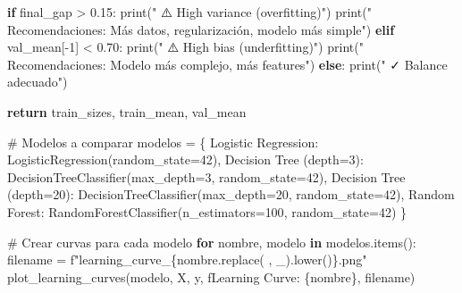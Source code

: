 \documentclass[
  doc,
  floatsintext,
  longtable,
  a4paper,
  nolmodern,
  notxfonts,
  notimes,
  12pt,
  colorlinks=true,linkcolor=blue,citecolor=blue,urlcolor=blue]{apa7}
\newenvironment{Shaded}{\begin{snugshade}}{\end{snugshade}}
\newcommand{\BuiltInTok}[1]{\textcolor[rgb]{0.00,0.23,0.31}{#1}}
\newcommand{\CommentTok}[1]{\textcolor[rgb]{0.37,0.37,0.37}{#1}}
\newcommand{\ControlFlowTok}[1]{\textcolor[rgb]{0.00,0.23,0.31}{\textbf{#1}}}
\newcommand{\DecValTok}[1]{\textcolor[rgb]{0.68,0.00,0.00}{#1}}
\newcommand{\FloatTok}[1]{\textcolor[rgb]{0.68,0.00,0.00}{#1}}
\newcommand{\KeywordTok}[1]{\textcolor[rgb]{0.00,0.23,0.31}{\textbf{#1}}}
\newcommand{\NormalTok}[1]{\textcolor[rgb]{0.00,0.23,0.31}{#1}}
\newcommand{\OperatorTok}[1]{\textcolor[rgb]{0.37,0.37,0.37}{#1}}
\newcommand{\SpecialCharTok}[1]{\textcolor[rgb]{0.37,0.37,0.37}{#1}}
\newcommand{\SpecialStringTok}[1]{\textcolor[rgb]{0.13,0.47,0.30}{#1}}
\newcommand{\StringTok}[1]{\textcolor[rgb]{0.13,0.47,0.30}{#1}}
\begin{document}
\begin{Shaded}
\begin{Highlighting}[]
    \ControlFlowTok{if}\NormalTok{ final\_gap }\OperatorTok{\textgreater{}} \FloatTok{0.15}\NormalTok{:}
        \BuiltInTok{print}\NormalTok{(}\StringTok{"  ⚠️  High variance (overfitting)"}\NormalTok{)}
        \BuiltInTok{print}\NormalTok{(}\StringTok{"  Recomendaciones: Más datos, regularización, modelo más simple"}\NormalTok{)}
    \ControlFlowTok{elif}\NormalTok{ val\_mean[}\OperatorTok{{-}}\DecValTok{1}\NormalTok{] }\OperatorTok{\textless{}} \FloatTok{0.70}\NormalTok{:}
        \BuiltInTok{print}\NormalTok{(}\StringTok{"  ⚠️  High bias (underfitting)"}\NormalTok{)}
        \BuiltInTok{print}\NormalTok{(}\StringTok{"  Recomendaciones: Modelo más complejo, más features"}\NormalTok{)}
    \ControlFlowTok{else}\NormalTok{:}
        \BuiltInTok{print}\NormalTok{(}\StringTok{"  ✓ Balance adecuado"}\NormalTok{)}
    
    \ControlFlowTok{return}\NormalTok{ train\_sizes, train\_mean, val\_mean}

\CommentTok{\# Modelos a comparar}
\NormalTok{modelos }\OperatorTok{=}\NormalTok{ \{}
    \StringTok{\textquotesingle{}Logistic Regression\textquotesingle{}}\NormalTok{: LogisticRegression(random\_state}\OperatorTok{=}\DecValTok{42}\NormalTok{),}
    \StringTok{\textquotesingle{}Decision Tree (depth=3)\textquotesingle{}}\NormalTok{: DecisionTreeClassifier(max\_depth}\OperatorTok{=}\DecValTok{3}\NormalTok{, random\_state}\OperatorTok{=}\DecValTok{42}\NormalTok{),}
    \StringTok{\textquotesingle{}Decision Tree (depth=20)\textquotesingle{}}\NormalTok{: DecisionTreeClassifier(max\_depth}\OperatorTok{=}\DecValTok{20}\NormalTok{, random\_state}\OperatorTok{=}\DecValTok{42}\NormalTok{),}
    \StringTok{\textquotesingle{}Random Forest\textquotesingle{}}\NormalTok{: RandomForestClassifier(n\_estimators}\OperatorTok{=}\DecValTok{100}\NormalTok{, random\_state}\OperatorTok{=}\DecValTok{42}\NormalTok{)}
\NormalTok{\}}

\CommentTok{\# Crear curvas para cada modelo}
\ControlFlowTok{for}\NormalTok{ nombre, modelo }\KeywordTok{in}\NormalTok{ modelos.items():}
\NormalTok{    filename }\OperatorTok{=} \SpecialStringTok{f"learning\_curve\_}\SpecialCharTok{\{}\NormalTok{nombre}\SpecialCharTok{.}\NormalTok{replace(}\StringTok{\textquotesingle{} \textquotesingle{}}\NormalTok{, }\StringTok{\textquotesingle{}\_\textquotesingle{}}\NormalTok{)}\SpecialCharTok{.}\NormalTok{lower()}\SpecialCharTok{\}}\SpecialStringTok{.png"}
\NormalTok{    plot\_learning\_curves(modelo, X, y, }\SpecialStringTok{f\textquotesingle{}Learning Curve: }\SpecialCharTok{\{}\NormalTok{nombre}\SpecialCharTok{\}}\SpecialStringTok{\textquotesingle{}}\NormalTok{, filename)}
\end{Highlighting}
\end{Shaded}
\end{document}
